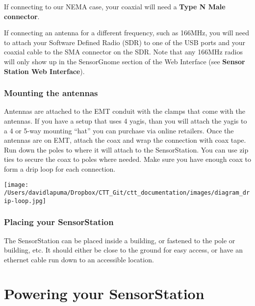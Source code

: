 \documentclass[
]{article}
\begin{document}
If connecting to our NEMA case, your coaxial will need a \textbf{Type N
Male connector}.

If connecting an antenna for a different frequency, such as 166MHz, you
will need to attach your Software Defined Radio (SDR) to one of the USB
ports and your coaxial cable to the SMA connector on the SDR. Note that
any 166MHz radios will only show up in the SensorGnome section of the
Web Interface (see \textbf{Sensor Station Web Interface}).

\hypertarget{mounting-the-antennas}{%
\subsubsection{Mounting the antennas}\label{mounting-the-antennas}}

Antennas are attached to the EMT conduit with the clamps that come with
the antennas. If you have a setup that uses 4 yagis, than you will
attach the yagis to a 4 or 5-way mounting ``hat'' you can purchase via
online retailers. Once the antennas are on EMT, attach the coax and wrap
the connection with coax tape. Run down the poles to where it will
attach to the SensorStation. You can use zip ties to secure the coax to
poles where needed. Make sure you have enough coax to form a drip loop
for each connection.

\texttt{[image: /Users/davidlapuma/Dropbox/CTT\_Git/ctt\_documentation/images/diagram\_drip-loop.jpg]}

\hypertarget{placing-your-sensorstation}{%
\subsubsection{Placing your
SensorStation}\label{placing-your-sensorstation}}

The SensorStation can be placed inside a building, or fastened to the
pole or building, etc. It should either be close to the ground for easy
access, or have an ethernet cable run down to an accessible location.

\hypertarget{powering-your-sensorstation}{%
\section{Powering your
SensorStation}\label{powering-your-sensorstation}}
\end{document}
